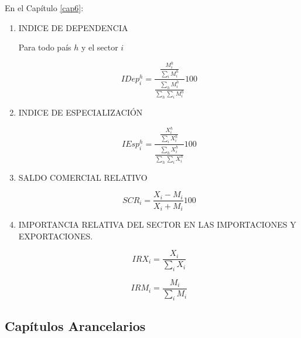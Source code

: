 \documentclass[a4paper,openright,12pt]{book}
\begin{document}
En el Capítulo \ref{cap6}:

\begin{enumerate}

    \item INDICE DE DEPENDENCIA

    Para todo país $h$ y el sector $i$

    \begin{equation}
    IDep^h_i = \frac{\frac{M^h_i}{\sum_i M^h_i}}{\frac{\sum_h M^h_i}{\sum_h \sum_i M^h_i}} 100
    \end{equation}

    \item INDICE DE ESPECIALIZACIÓN

    \begin{equation}
    IEsp^h_i = \frac{\frac{X^h_i}{\sum_i X^h_i}}{\frac{\sum_h X^h_i}{\sum_h \sum_i X^h_i}} 100
    \end{equation}

    \item SALDO COMERCIAL RELATIVO

    \begin{equation}
    SCR_i = \frac{X_i - M_i}{X_i + M_i} 100
    \end{equation}

    \item IMPORTANCIA RELATIVA DEL SECTOR EN LAS IMPORTACIONES Y EXPORTACIONES.

    \begin{equation}
    IRX_i = \frac{X_i}{\sum_i X_i}
    \end{equation}

    \begin{equation}
    IRM_i = \frac{M_i}{\sum_i M_i}
    \end{equation}

\end{enumerate}

\subsection{Capítulos Arancelarios}
\end{document}
